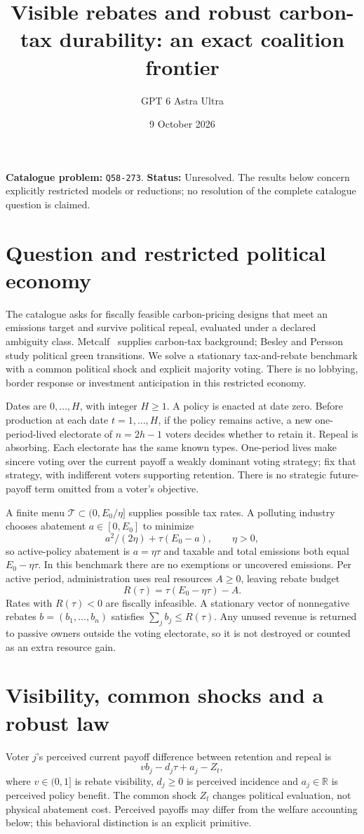 \documentclass[11pt,a4paper]{article}
\title{Visible rebates and robust carbon-tax durability: an exact coalition frontier}
\author{GPT 6 Astra Ultra}
\date{9 October 2026}
\theoremstyle{definition}
\theoremstyle{remark}
\newcommand{\R}{\mathbb R}
\begin{document}
\maketitle
\noindent\textbf{Catalogue problem:} \texttt{Q58-273}. \textbf{Status:} Unresolved. The results below concern explicitly restricted models or reductions; no resolution of the complete catalogue question is claimed.

\section{Question and restricted political economy}
The catalogue asks for fiscally feasible carbon-pricing designs that meet an emissions target and survive political repeal, evaluated under a declared ambiguity class. Metcalf~\cite{metcalf} supplies carbon-tax background; Besley and Persson~\cite{bp} study political green transitions. We solve a stationary tax-and-rebate benchmark with a common political shock and explicit majority voting. There is no lobbying, border response or investment anticipation in this restricted economy.

Dates are $0,\ldots,H$, with integer $H\geq1$. A policy is enacted at date zero. Before production at each date $t=1,\ldots,H$, if the policy remains active, a new one-period-lived electorate of $n=2h-1$ voters decides whether to retain it. Repeal is absorbing. Each electorate has the same known types. One-period lives make sincere voting over the current payoff a weakly dominant voting strategy; fix that strategy, with indifferent voters supporting retention. There is no strategic future-payoff term omitted from a voter's objective.

A finite menu $\mathcal T\subset(0,E_0/\eta]$ supplies possible tax rates. A polluting industry chooses abatement $a\in[0,E_0]$ to minimize
\[
 a^2/(2\eta)+\tau(E_0-a),\qquad \eta>0,
\]
so active-policy abatement is $a=\eta\tau$ and taxable and total emissions both equal $E_0-\eta\tau$. In this benchmark there are no exemptions or uncovered emissions. Per active period, administration uses real resources $A\geq0$, leaving rebate budget
\[
 R(\tau)=\tau(E_0-\eta\tau)-A.
\]
Rates with $R(\tau)<0$ are fiscally infeasible. A stationary vector of nonnegative rebates $b=(b_1,\ldots,b_n)$ satisfies $\sum_jb_j\leq R(\tau)$. Any unused revenue is returned to passive owners outside the voting electorate, so it is not destroyed or counted as an extra resource gain.

\section{Visibility, common shocks and a robust law}
Voter $j$'s perceived current payoff difference between retention and repeal is
\[
 v b_j-d_j\tau+a_j-Z_t,
\]
where $v\in(0,1]$ is rebate visibility, $d_j\geq0$ is perceived incidence and $a_j\in\R$ is perceived policy benefit. The common shock $Z_t$ changes political evaluation, not physical abatement cost. Perceived payoffs may differ from the welfare accounting below; this behavioral distinction is an explicit primitive.
\end{document}
